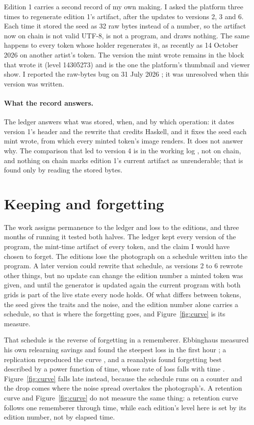 \documentclass[11pt]{article}
\begin{document}
Edition 1 carries a second record of my own making. I asked the platform three times to regenerate edition 1's artifact, after the updates to versions 2, 3 and 6. Each time it stored the seed as 32 raw bytes instead of a number, so the artifact now on chain is not valid UTF-8, is not a program, and draws nothing. The same happens to every token whose holder regenerates it, as recently as 14 October 2026 on another artist's token. The version the mint wrote remains in the block that wrote it (level 14305273) and is the one the platform's thumbnail and viewer show. I reported the raw-bytes bug on 31 July 2026 \citep{bootloaderissue30}; it was unresolved when this version was written.

\paragraph{What the record answers.} The ledger answers what was stored, when, and by which operation: it dates version 1's header and the rewrite that credits Haskell, and it fixes the seed each mint wrote, from which every minted token's image renders. It does not answer why. The comparison that led to version 4 is in the working log \citep{workinglog2026}, not on chain, and nothing on chain marks edition 1's current artifact as unrenderable; that is found only by reading the stored bytes.

\section{Keeping and forgetting}
\label{sec:context}

The work assigns permanence to the ledger and loss to the editions, and three months of running it tested both halves. The ledger kept every version of the program, the mint-time artifact of every token, and the claim I would have chosen to forget. The editions lose the photograph on a schedule written into the program. A later version could rewrite that schedule, as versions 2 to 6 rewrote other things, but no update can change the edition number a minted token was given, and until the generator is updated again the current program with both grids is part of the live state every node holds. Of what differs between tokens, the seed gives the traits and the noise, and the edition number alone carries a schedule, so that is where the forgetting goes, and Figure~\ref{fig:curve} is its measure.

That schedule is the reverse of forgetting in a rememberer. Ebbinghaus measured his own relearning savings and found the steepest loss in the first hour \citep{ebbinghaus1885}; a replication reproduced the curve \citep{murre2015}, and a reanalysis found forgetting best described by a power function of time, whose rate of loss falls with time \citep{wixted1991}. Figure~\ref{fig:curve} falls late instead, because the schedule runs on a counter and the drop comes where the noise spread overtakes the photograph's. A retention curve and Figure~\ref{fig:curve} do not measure the same thing: a retention curve follows one rememberer through time, while each edition's level here is set by its edition number, not by elapsed time.
\end{document}
